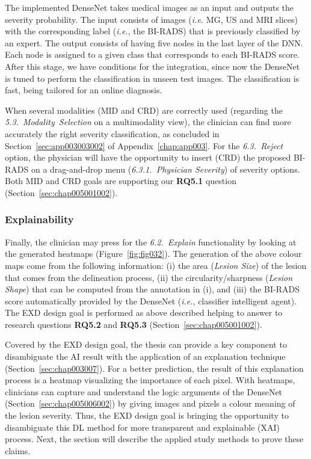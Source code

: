 The implemented DenseNet takes medical images as an input and outputs the severity probability.
The input consists of images ({\it i.e.} \ac{MG}, \ac{US} and \ac{MRI} slices) with the corresponding label ({\it i.e.}, the \ac{BI-RADS}) that is previously classified by an expert.
The output consists of having five nodes in the last layer of the \ac{DNN}.
Each node is assigned to a given class that corresponds to each \ac{BI-RADS} score.
After this stage, we have conditions for the integration, since now the DenseNet is tuned to perform the classification in unseen test images.
The classification is fast, being tailored for an online diagnosis.

When several modalities (\ac{MID} and \ac{CRD}) are correctly used (regarding the {\it 5.3.~Modality~Selection} on a multimodality view), the clinician can find more accurately the right severity classification, as concluded in Section~\ref{sec:app003003002} of Appendix~\ref{chap:app003}.
For the {\it 6.3.~Reject} option, the physician will have the opportunity to insert (\ac{CRD}) the proposed \ac{BI-RADS} on a drag-and-drop menu ({\it 6.3.1.~Physician Severity}) of severity options.
Both \ac{MID} and \ac{CRD} goals are supporting our {\bf RQ5.1} question (Section~\ref{sec:chap005001002}).

\subsubsection{Explainability}
\label{sec:chap005004002002}

Finally, the clinician may press for the {\it 6.2.~Explain} functionality  by looking at the generated heatmaps (Figure~\ref{fig:fig032}).
The generation of the above colour maps come from the following information: (i) the area ({\it Lesion Size}) of the lesion that comes from the delineation process, (ii) the circularity/sharpness ({\it Lesion Shape}) that can be computed from the annotation in (i), and (iii) the \ac{BI-RADS} score automatically provided by the DenseNet ({\it i.e.}, classifier intelligent agent).
The \ac{EXD} design goal is performed as above described helping to answer to research questions {\bf RQ5.2} and {\bf RQ5.3} (Section~\ref{sec:chap005001002}).

Covered by the \ac{EXD} design goal, the thesis can provide a key component to disambiguate the \ac{AI} result with the application of an explanation technique (Section~\ref{sec:chap003007}).
For a better prediction, the result of this explanation process is a heatmap visualizing the importance of each pixel.
With heatmaps, clinicians can capture and understand the logic arguments of the DenseNet (Section~\ref{sec:chap005006002}) by giving images and pixels a colour meaning of the lesion severity.
Thus, the \ac{EXD} design goal is bringing the opportunity to disambiguate this \ac{DL} method for more transparent and explainable (\ac{XAI}) process.
Next, the section will describe the applied study methods to prove these claims.



